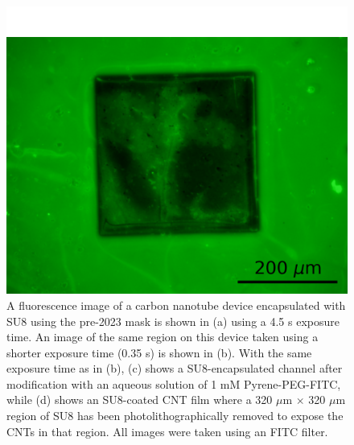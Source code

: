\documentclass[
  a4paper,
]{scrbook}
\begin{document}
\begin{figure}
\begin{minipage}[t]{0.47\linewidth}
{{\includegraphics{figures/ch6/modified_CNT20_1mMPPF_window4_350ms_12.6X_221124.png}

}

}

\subcaption{\label{fig-SU8-FITC-CNT}}
\end{minipage}%

\caption{\label{fig-FITC-SU8}A fluorescence image of a carbon nanotube
device encapsulated with SU8 using the pre-2023 mask is shown in (a)
using a 4.5 s exposure time. An image of the same region on this device
taken using a shorter exposure time (0.35 s) is shown in (b). With the
same exposure time as in (b), (c) shows a SU8-encapsulated channel after
modification with an aqueous solution of 1 mM Pyrene-PEG-FITC, while (d)
shows an SU8-coated CNT film where a 320 \(\mu\)m \(\times\) 320
\(\mu\)m region of SU8 has been photolithographically removed to expose
the CNTs in that region. All images were taken using an FITC filter.}

\end{figure}
\end{document}
